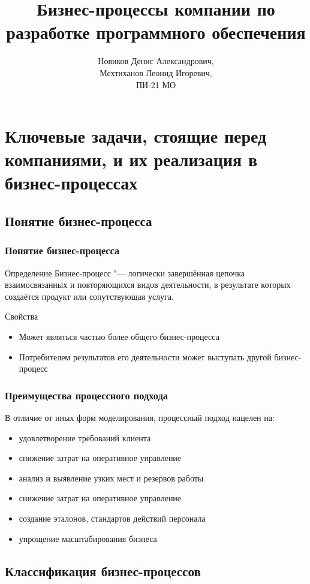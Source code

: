 \documentclass{../industrial-development}
\title{Бизнес-процессы компании по разработке программного обеспечения}
\author{Новиков Денис Александрович, \\Мехтиханов Леонид Игоревич, \\ПИ-21 МО}
\date{}
\begin{document}
\begin{frame}
  \titlepage
\end{frame}


\section{Ключевые задачи, стоящие перед компаниями, и их реализация в бизнес-процессах}

\subsection{Понятие бизнес-процесса}


\begin{frame} \frametitle{Понятие бизнес-процесса}
	\begin{block}{Определение}
		\alert{Бизнес-процесс} "--- логически завершённая цепочка взаимосвязанных и повторяющихся видов деятельности, в результате которых создаётся продукт или сопутствующая услуга.
	\end{block}
	\begin{block}{Свойства}
		\begin{itemize}
			\item Может являться частью более общего бизнес-процесса
			\item Потребителем результатов его деятельности может выступать другой бизнес-процесс
		\end{itemize}
	\end{block}
\end{frame}
\lecturenotes


\begin{frame} \frametitle{Преимущества процессного подхода}
	В отличие от иных форм моделирования, процессный подход нацелен на:
	\begin{itemize}
		\item удовлетворение требований клиента
		\item снижение затрат на оперативное управление
		\item анализ и выявление узких мест и резервов работы
		\item снижение затрат на оперативное управление
		\item создание эталонов, стандартов действий персонала
		\item упрощение масштабирования бизнеса
	\end{itemize}
\end{frame}
\lecturenotes


\subsection{Классификация бизнес-процессов}
\end{document}
